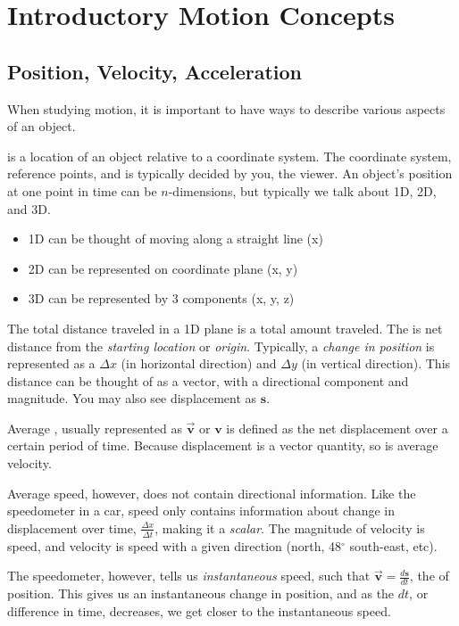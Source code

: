 \chapter{Introductory Motion Concepts}
\section{Position, Velocity, Acceleration}

When studying motion, it is important to have ways to describe various aspects of an object. 

 is a location of an object relative to a coordinate system. The coordinate system, reference points, and  is typically decided by you, the viewer. An object's position at one point in time can be $n$-dimensions, but typically we talk about 1D, 2D, and 3D.

\begin{itemize}
    \item 1D can be thought of moving along a straight line (x)
    \item 2D can be represented on coordinate plane (x, y)
    \item 3D can be represented by 3 components (x, y, z)
\end{itemize}

The total distance traveled in a 1D plane is a total amount traveled. The  is net distance from the \emph{starting location} or \emph{origin}. Typically, a \emph{change in position} is represented as a $\Delta x$ (in horizontal direction) and $\Delta y$  (in vertical direction). This distance can be thought of as a vector, with a directional component and magnitude. You may also see displacement as $\mathbf s$.


Average , usually represented as $\vec{\mathbf{v}}$ or $\mathbf{v}$ is defined as the net displacement over a certain period of time. Because displacement is a vector quantity, so is average velocity. 

Average speed, however, does not contain directional information. Like the speedometer in a car, speed only contains information about change in displacement over time, $\tfrac{\Delta x}{\Delta t}$, making it a \emph{scalar}. The magnitude of velocity is speed, and velocity is speed with a given direction (north, 48$^\circ$ south-east, etc). 

The speedometer, however, tells us \emph{instantaneous} speed, such that $\vec{\mathbf{v}} = \tfrac{d\mathbf{s}}{dt}$, the  of position. This gives us an instantaneous change in position, and as the $dt$, or difference in time, decreases, we get closer to the instantaneous speed. 

